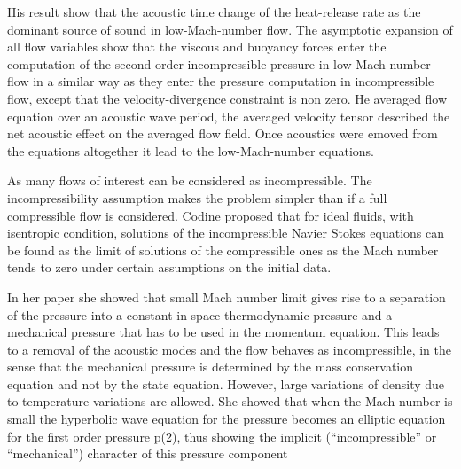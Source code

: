 \documentclass[10pt]{ubthesis}
\begin{document}
\bigskip 
\noindent His result show that the acoustic time change of the heat-release rate as the dominant source of sound in low-Mach-number flow. The asymptotic expansion of all flow variables show that the viscous and buoyancy forces enter the computation of the second-order incompressible pressure in low-Mach-number flow in a similar way as they enter the pressure computation in incompressible flow, except that the
velocity-divergence constraint is non zero. He averaged flow equation over an acoustic wave period, the averaged velocity tensor described the net acoustic effect on the averaged flow field. Once acoustics were emoved from the equations altogether it lead to the low-Mach-number equations.

\bigskip
\noindent As many flows of interest can be considered as incompressible. The incompressibility assumption makes the problem simpler than if a full compressible flow is considered. Codine \cite{Codina} proposed that for ideal fluids, with isentropic condition, solutions of the incompressible Navier Stokes equations can be found as the limit of solutions of the compressible ones as the Mach number tends to zero under certain assumptions on the initial data.

\noindent In her paper she showed that small Mach number limit gives rise to a separation of the pressure into a constant-in-space thermodynamic pressure and a mechanical pressure that has to be used in the momentum equation. This leads to a removal of the acoustic modes and the flow behaves as incompressible, in the sense that the mechanical pressure is determined by the mass conservation
equation and not by the state equation. However, large variations of density
due to temperature variations are allowed. She showed that when the Mach number is small the hyperbolic wave equation for the pressure becomes an elliptic
equation for the first order pressure p(2), thus showing the implicit (“incompressible” or “mechanical”) character of this pressure component
\end{document}
